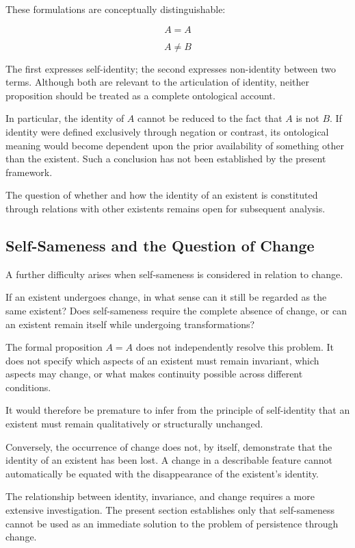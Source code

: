 These formulations are conceptually distinguishable:

\[
A = A
\]

\[
A \neq B
\]

The first expresses self-identity; the second expresses non-identity between two terms. Although both are relevant to the articulation of identity, neither proposition should be treated as a complete ontological account.

In particular, the identity of \(A\) cannot be reduced to the fact that \(A\) is not \(B\). If identity were defined exclusively through negation or contrast, its ontological meaning would become dependent upon the prior availability of something other than the existent. Such a conclusion has not been established by the present framework.

The question of whether and how the identity of an existent is constituted through relations with other existents remains open for subsequent analysis.

\subsection{Self-Sameness and the Question of Change}

A further difficulty arises when self-sameness is considered in relation to change.

If an existent undergoes change, in what sense can it still be regarded as the same existent? Does self-sameness require the complete absence of change, or can an existent remain itself while undergoing transformations?

The formal proposition \(A = A\) does not independently resolve this problem. It does not specify which aspects of an existent must remain invariant, which aspects may change, or what makes continuity possible across different conditions.

It would therefore be premature to infer from the principle of self-identity that an existent must remain qualitatively or structurally unchanged.

Conversely, the occurrence of change does not, by itself, demonstrate that the identity of an existent has been lost. A change in a describable feature cannot automatically be equated with the disappearance of the existent's identity.

The relationship between identity, invariance, and change requires a more extensive investigation. The present section establishes only that self-sameness cannot be used as an immediate solution to the problem of persistence through change.

